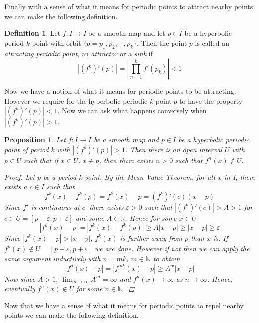 \documentclass[11pt,a4paper,oneside]{memoir}
\theoremstyle{plain}
\newtheorem{prop}[thm]{Proposition}
\theoremstyle{definition}
\newtheorem{defn}[thm]{Definition}
\begin{document}
Finally with a sense of what it means for periodic points to attract nearby points we can make the following definition.

\begin{defn} \label{def:attractor}
    Let $f: I \to I$ be a smooth map and let $p \in I$ be a hyperbolic period-$k$ point with orbit $\lbrace p = p_1, p_2, \cdots, p_k \rbrace$. Then the point $p$ is called an \emph{attracting periodic point}, an \emph{attractor} or a \emph{sink} if \[|(f^k)'(p)| = \left\lvert \prod_{n = 1}^k f'(p_k) \right\rvert < 1\]
\end{defn}

Now we have a notion of what it means for periodic points to be attracting. However we require for the hyperbolic periodic-$k$ point $p$ to have the property $|(f^k)'(p)| < 1$. Now we can ask what happens conversely when $|(f^k)'(p)| > 1$.

\begin{prop} \label{prop:repellor}
    Let $f: I \to I$ be a smooth map and $p \in I$ be a hyperbolic periodic point of period $k$ with $|(f^k)'(p)| > 1$. Then there is an open interval $U$ with $p \in U$ such that if $x \in U$, $x \neq p$, then there exists $n > 0$ such that $f^n(x) \notin U$.

    \begin{proof}
        Let $p$ be a period-$k$ point. By the Mean Value Theorem, for all $x$ in I, there exists a $c \in I$ such that \[f^k(x) - f^k(p) = f^k(x) - p = (f^k)'(c)(x - p)\] Since $f'$ is continuous at $c$, there exists $\varepsilon > 0$ such that $|(f^k)'(c)| > A > 1$ for $c \in U = [p - \varepsilon, p + \varepsilon]$ and some $A \in \mathbb{R}$. Hence for some $x \in U$ \[|f^k(x) - p| = |f^k(x) - f^k(p)| \geq A|x - p| \geq |x - p| \geq \varepsilon\] Since $|f^k(x) - p| > |x - p|$, $f^k(x)$ is further away from $p$ than $x$ is. If $f^k(x) \notin U = [p - \varepsilon, p + \varepsilon]$ we are done. However if not then we can apply the same argument inductively with $n = mk$, $m \in \mathbb{N}$ to obtain \[ |f^n(x) - p| = |f^{mk}(x) - p| \geq A^m|x - p|\] Now since $A > 1$, $\lim_{m \to \infty}A^m = \infty$ and $f^n(x) \to \infty$ as $n \to \infty$. Hence, eventually $f^n(x) \notin U$ for some $n \in \mathbb{N}$.
    \end{proof}
\end{prop}

Now that we have a sense of what it means for periodic points to repel nearby points we can make the following definition.
\end{document}
